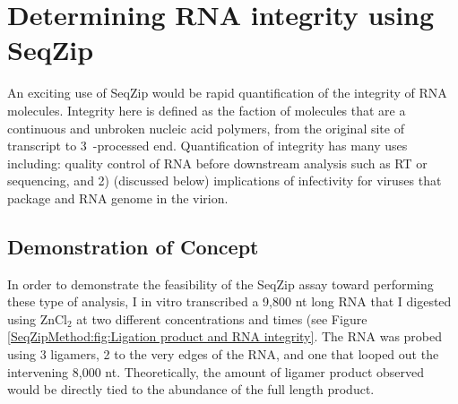 \section{Determining RNA integrity using SeqZip}
  \label{SeqZipMethod:sec:RNA Integrity via SeqZip}

  An exciting use of SeqZip would be rapid quantification of the integrity of RNA molecules. Integrity here is defined as the faction of molecules that are a continuous and unbroken nucleic acid polymers, from the original site of transcript to 3\textprime~-processed end. Quantification of integrity has many uses including: quality control of RNA before downstream analysis such as RT or sequencing, and 2) (discussed below) implications of infectivity for viruses that package and RNA genome in the virion.

  \subsection{Demonstration of Concept}
    \label{SeqZipMethod:subsec:SeqZip can be used to examine viral genomes}

    In order to demonstrate the feasibility of the SeqZip assay toward performing these type of analysis, I in vitro transcribed a 9,800 nt long RNA that I digested using ZnCl$_{2}$ at two different concentrations and times (see Figure \ref{SeqZipMethod:fig:Ligation product and RNA integrity}. The RNA was probed using 3 ligamers, 2 to the very edges of the RNA, and one that looped out the intervening 8,000 nt. Theoretically, the amount of ligamer product observed would be directly tied to the abundance of the full length product.

